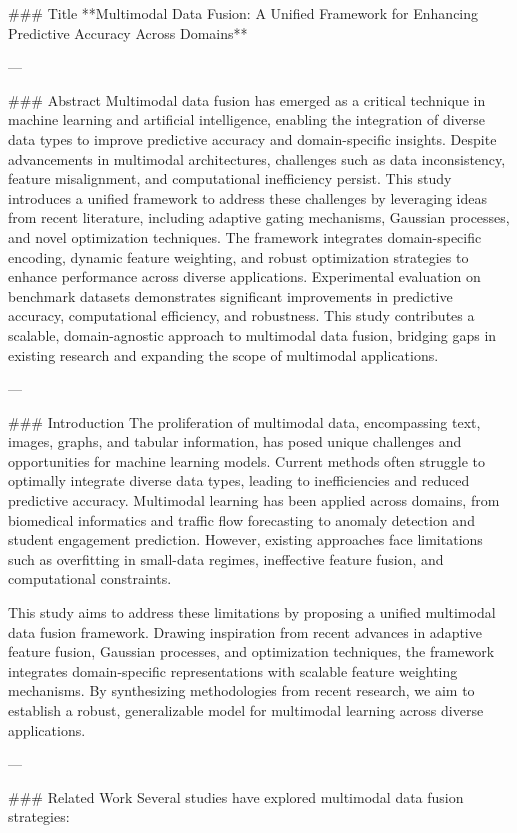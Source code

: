 ### Title
**Multimodal Data Fusion: A Unified Framework for Enhancing Predictive Accuracy Across Domains**

---

### Abstract
Multimodal data fusion has emerged as a critical technique in machine learning and artificial intelligence, enabling the integration of diverse data types to improve predictive accuracy and domain-specific insights. Despite advancements in multimodal architectures, challenges such as data inconsistency, feature misalignment, and computational inefficiency persist. This study introduces a unified framework to address these challenges by leveraging ideas from recent literature, including adaptive gating mechanisms, Gaussian processes, and novel optimization techniques. The framework integrates domain-specific encoding, dynamic feature weighting, and robust optimization strategies to enhance performance across diverse applications. Experimental evaluation on benchmark datasets demonstrates significant improvements in predictive accuracy, computational efficiency, and robustness. This study contributes a scalable, domain-agnostic approach to multimodal data fusion, bridging gaps in existing research and expanding the scope of multimodal applications.

---

### Introduction
The proliferation of multimodal data, encompassing text, images, graphs, and tabular information, has posed unique challenges and opportunities for machine learning models. Current methods often struggle to optimally integrate diverse data types, leading to inefficiencies and reduced predictive accuracy. Multimodal learning has been applied across domains, from biomedical informatics and traffic flow forecasting to anomaly detection and student engagement prediction. However, existing approaches face limitations such as overfitting in small-data regimes, ineffective feature fusion, and computational constraints. 

This study aims to address these limitations by proposing a unified multimodal data fusion framework. Drawing inspiration from recent advances in adaptive feature fusion, Gaussian processes, and optimization techniques, the framework integrates domain-specific representations with scalable feature weighting mechanisms. By synthesizing methodologies from recent research, we aim to establish a robust, generalizable model for multimodal learning across diverse applications.

---

### Related Work
Several studies have explored multimodal data fusion strategies:

